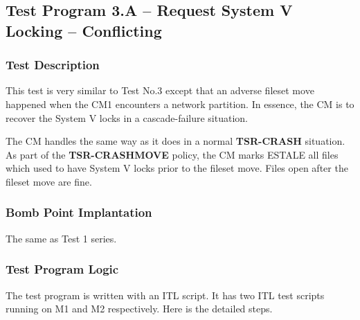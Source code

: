 \pagebreak 
\subsection {Test Program 3.A -- Request System V Locking -- Conflicting}

\subsubsection {Test Description}

This test is very similar to Test No.3 except that an adverse fileset move
happened when the CM1 encounters a network partition. In essence, the CM
is to recover the System V locks in a cascade-failure situation.

The CM handles the same way as it does in a normal {\bf TSR-CRASH} situation.
As part of the {\bf TSR-CRASHMOVE} policy, the CM marks ESTALE all files which
used to have System V locks prior to the fileset move. Files open after the
fileset move are fine.

\subsubsection {Bomb Point Implantation}

The same as Test 1 series.

\subsubsection {Test Program Logic}

The test program is written with an ITL script. It has two ITL test scripts
running on M1 and M2 respectively. Here is the detailed steps. 


